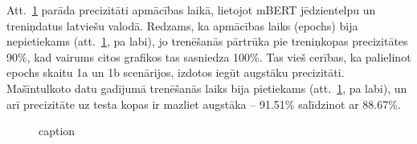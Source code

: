 Att.~\ref{fig:chatbot-bert} parāda precizitāti apmācības laikā, lietojot mBERT jēdzientelpu un treniņdatus latviešu valodā. Redzams, ka apmācības laiks (epochs) bija nepietiekams (att.~\ref{fig:chatbot-bert}, pa labi), jo trenēšanās pārtrūka pie treniņkopas precizitātes 90\%, kad vairums citos grafikos tas sasniedza 100\%. Tas vieš cerības, ka palielinot epochs skaitu 1a un 1b scenārijos, izdotos iegūt augstāku precizitāti. Mašīntulkoto datu gadījumā trenēšanās laiks bija pietiekams (att.~\ref{fig:chatbot-bert}, pa labi), un arī precizitāte uz testa kopas ir mazliet augstāka -- 91.51\% salīdzinot ar 88.67\%.

\begin{figure}[h] 
   \centering
   \caption{caption} 
   \label{fig:chatbot-bert}
\end{figure}


